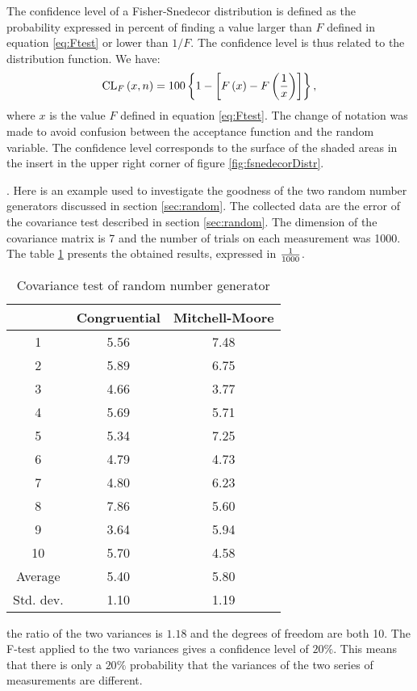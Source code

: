 \documentclass[twoside]{book}
\begin{document}
The confidence level of a Fisher-Snedecor distribution is defined
as the probability expressed in percent of finding a value larger
than $F$ defined in equation \ref{eq:Ftest} or lower than $1/F$.
The confidence level is thus related to the distribution function.
We have:
\begin{equation}
\label{eq:fcl}
  {\mathop{\rm CL}}_F\left(x,n\right)=100\left\{1-\left[F\left(x\right)-F\left({1\over x}\right)
  \right]\right\},
\end{equation}
where $x$ is the value $F$ defined in equation \ref{eq:Ftest}. The
change of notation was made to avoid confusion between the
acceptance function and the random variable.  The confidence level
corresponds to the surface of the shaded areas in the insert in
the upper right corner of figure \ref{fig:fsnedecorDistr}.

. Here is an example used to investigate the
goodness of the two random number generators discussed in section
\ref{sec:random}. The collected data are the error of the
covariance test described in section \ref{sec:random}. The
dimension of the covariance matrix is 7 and the number of trials
on each measurement was 1000. The table \ref{tb:Ftest} presents
the obtained results, expressed in ${1\over 1000}$.
\begin{table}[h]
\vspace{1 ex}
  \centering
  \caption{Covariance test of random number generator}\label{tb:Ftest}
\vspace{1 ex}
  \begin{tabular}{|c|c|c|} \hline
     & Congruential & Mitchell-Moore \\ \hline
    1 & 5.56 & 7.48 \\
    2 & 5.89 & 6.75 \\
    3 & 4.66 & 3.77 \\
    4 & 5.69 & 5.71 \\
    5 & 5.34 & 7.25 \\
    6 & 4.79 & 4.73 \\
    7 & 4.80 & 6.23 \\
    8 & 7.86 & 5.60 \\
    9 & 3.64 & 5.94 \\
    10 & 5.70 & 4.58 \\ \hline
    Average & 5.40 & 5.80 \\
    Std. dev. & 1.10 & 1.19 \\ \hline
  \end{tabular}
\end{table}
the ratio of the two variances is $1.18$ and the degrees of
freedom are both 10. The F-test applied to the two variances gives
a confidence level of $20\%$. This means that there is only a
$20\%$ probability that the variances of the two series of
measurements are different.
\end{document}
